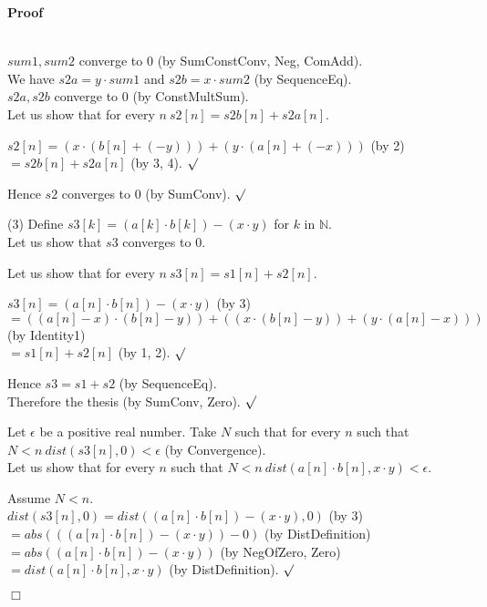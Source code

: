 \documentclass{article}
\newenvironment{forthel}{\begin{leftbar}}{\end{leftbar}}
\newenvironment{proof}{\noindent\textbf{Proof\ }}{\hspace*{\fill}$\Box$\medskip}
\newenvironment{subproof}{\begin{list}{}{}
		\item[\text{Proof}]}{\hfill $\surd$ \end{list}}
\newcommand{\NN}{\mathbb{N}}
\newcommand{\cdottwo}{\cdot}
\newcommand{\plusone}{+}
\newcommand{\dotequal}{=}
\begin{document}
\begin{forthel}
\begin{proof}
\begin{subproof}
	\\$sum1, sum2$ converge to $0$ (by SumConstConv, Neg, ComAdd).
	\\We have $s2a = y \cdottwo sum1$ and $s2b = x \cdottwo sum2$ (by SequenceEq).
	\\$s2a, s2b$ converge to $0$ (by ConstMultSum). 
	\\Let us show that for every $n \ s2[n] = s2b[n] + s2a[n]$.
	\begin{subproof}
	$s2[n] \dotequal (x \cdot (b[n] + (-y))) + (y \cdot (a[n] + (-x)))$ (by 2)
	$\dotequal s2b[n] + s2a[n]$ (by 3, 4).
	\end{subproof}
	Hence $s2$ converges to $0$ (by SumConv).
	\end{subproof}
	(3) Define $s3[k] = (a[k] \cdot b[k]) - (x \cdot y)$ for $k$ in $\NN$.
	\\Let us show that $s3$ converges to $0$.
	\begin{subproof}
	Let us show that for every $n \ s3[n] = s1[n] + s2[n]$.
	\begin{subproof}
	$s3[n] \dotequal (a[n] \cdot b[n]) - (x \cdot y)$ (by 3)
	\\$\dotequal ((a[n] - x) \cdot (b[n] - y)) + ((x \cdot (b[n] - y)) + (y \cdot (a[n] - x)))$ (by Identity1)
	\\$\dotequal s1[n] + s2[n]$ (by 1, 2).
	\end{subproof}
	Hence $s3 = s1 \plusone s2$ (by SequenceEq).
	\\Therefore the thesis (by SumConv, Zero).
	\end{subproof}
	Let $\epsilon$ be a positive real number.
	Take $N$ such that for every $n$ such that $N < n \ dist(s3[n],0) < \epsilon$ (by Convergence).
	\\Let us show that for every $n$ such that $N < n \ dist(a[n] \cdot b[n],x \cdot y) < \epsilon$.
	\begin{subproof}
	Assume $N < n$.
	\\$dist(s3[n],0) \dotequal dist((a[n] \cdot b[n]) - (x \cdot y),0)$ (by 3)
	\\$\dotequal abs(((a[n] \cdot b[n]) - (x \cdot y)) - 0)$ (by DistDefinition)
	\\$\dotequal abs((a[n] \cdot b[n]) - (x \cdot y))$ (by NegOfZero, Zero)
	\\$\dotequal dist(a[n] \cdot b[n],x \cdot y)$ (by DistDefinition).
	\end{subproof}
	\end{proof}


\end{forthel}
\end{document}
